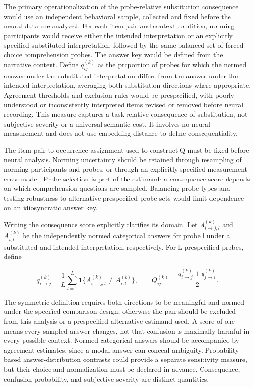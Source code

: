 \documentclass[11pt]{article}
\begin{document}
The primary operationalization of the probe-relative substitution
consequence would use an independent behavioral sample, collected and
fixed before the neural data are analyzed. For each item pair and
context condition, norming participants would receive either the
intended interpretation or an explicitly specified substituted
interpretation, followed by the same balanced set of forced-choice
comprehension probes. The answer key would be defined from the narrative
content. Define \(q_{ij}^{(k)}\) as the proportion of probes for which
the normed answer under the substituted interpretation differs from the
answer under the intended interpretation, averaging both substitution
directions where appropriate. Agreement thresholds and exclusion rules
would be prespecified, with poorly understood or inconsistently
interpreted items revised or removed before neural recording. This
measure captures a task-relative consequence of substitution, not
subjective severity or a universal semantic cost. It involves no neural
measurement and does not use embedding distance to define
consequentiality.

The item-pair-to-occurrence assignment used to construct Q must be fixed
before neural analysis. Norming uncertainty should be retained through
resampling of norming participants and probes, or through an explicitly
specified measurement-error model. Probe selection is part of the
estimand: a consequence score depends on which comprehension questions
are sampled. Balancing probe types and testing robustness to alternative
prespecified probe sets would limit dependence on an idiosyncratic
answer key.

Writing the consequence score explicitly clarifies its domain. Let
\(A_{i\to j,l}^{(k)}\) and \(A_{i,l}^{(k)}\) be the independently normed
categorical answers for probe l under a substituted and intended
interpretation, respectively. For L prespecified probes, define

\begin{equation}
q_{i\to j}^{(k)}=\frac{1}{L}\sum_{l=1}^{L}
\mathbf 1\{A_{i\to j,l}^{(k)}\ne A_{i,l}^{(k)}\},\qquad
Q_{ij}^{(k)}=\frac{q_{i\to j}^{(k)}+q_{j\to i}^{(k)}}{2}.
\end{equation}

The symmetric definition requires both directions to be meaningful and
normed under the specified comparison design; otherwise the pair should
be excluded from this analysis or a prespecified alternative estimand
used. A score of one means every sampled answer changes, not that
confusion is maximally harmful in every possible context. Normed
categorical answers should be accompanied by agreement estimates, since
a modal answer can conceal ambiguity. Probability-based
answer-distribution contrasts could provide a separate sensitivity
measure, but their choice and normalization must be declared in advance.
Consequence, confusion probability, and subjective severity are distinct
quantities.
\end{document}
